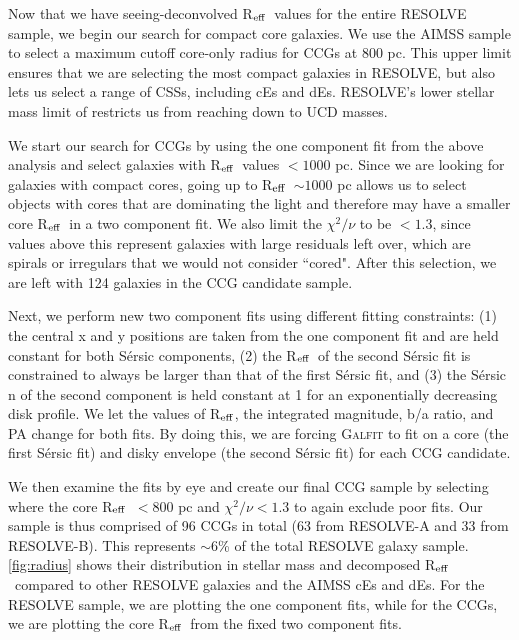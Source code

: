 \documentclass[iop,apj]{emulateapj}
\newcommand{\Reff}{R$_{\rm eff}$}
\begin{document}
\noindent Now that we have seeing-deconvolved \Reff\ values for the entire RESOLVE sample, we begin our search for compact core galaxies. We use the AIMSS sample to select a maximum cutoff core-only radius for CCGs at 800 pc. This upper limit ensures that we are selecting the most compact galaxies in RESOLVE, but also lets us select a range of CSSs, including cEs and dEs. RESOLVE's lower stellar mass limit of  restricts us from reaching down to UCD masses.

We start our search for CCGs by using the one component fit from the above analysis and select galaxies with \Reff\ values $<1000$ pc. Since we are looking for galaxies with compact cores, going up to \Reff\ $\sim 1000$ pc allows us to select objects with cores that are dominating the light and therefore may have a smaller core \Reff\ in a two component fit. We also limit the  $\chi^2/\nu$ to be $<1.3$, since values above this represent galaxies with large residuals left over, which are spirals or irregulars that we would not consider ``cored". After this selection, we are left with 124 galaxies in the CCG candidate sample.

Next, we perform new two component fits using different fitting constraints: (1) the central x and y positions are taken from the one component fit and are held constant for both S\'ersic components, (2) the \Reff\ of the second S\'ersic fit is constrained to always be larger than that of the first S\'ersic fit, and (3) the S\'ersic n of the second component is held constant at 1 for an exponentially decreasing disk profile. We let the values of \Reff, the integrated magnitude, b/a ratio, and PA change for both fits. By doing this, we are forcing \textsc{Galfit} to fit on a core (the first S\'ersic fit) and disky envelope (the second S\'ersic fit) for each CCG candidate.

We then examine the fits by eye and create our final CCG sample by selecting where the core \Reff\ $< 800$ pc and $\chi^2/\nu < 1.3$ to again exclude poor fits. Our sample is thus comprised of 96 CCGs in total (63 from RESOLVE-A and 33 from RESOLVE-B). This represents $\sim6$\% of the total RESOLVE galaxy sample. \autoref{fig:radius} shows their distribution in stellar mass and decomposed \Reff\ compared to other RESOLVE galaxies and the AIMSS cEs and dEs. For the RESOLVE sample, we are plotting the one component fits, while for the CCGs, we are plotting the core \Reff\ from the fixed two component fits. 
\end{document}
